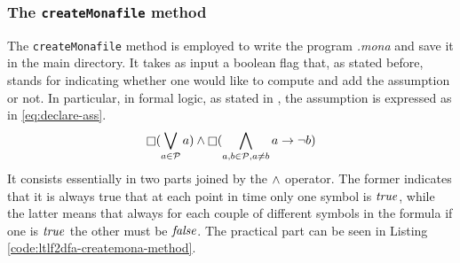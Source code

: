 \subsubsection{The \texttt{createMonafile} method}
The \texttt{createMonafile} method is employed to write the program \textit{.mona} and save it in the main directory. It takes as input a boolean flag that, as stated before, stands for indicating whether one would like to compute and add the \declare assumption or not. In particular, in formal logic, as stated in \citep{DeGiacomo:2014:RLF:2893873.2894033}, the \declare assumption is expressed as in \ref{eq:declare-ass}.
\begin{equation}\label{eq:declare-ass}
\Always (\bigvee_{a \in \P} a) \lAND \Always (\bigwedge_{a,b \in \P, a \neq b} a \rightarrow \NOT b) 
\end{equation}
It consists essentially in two parts joined by the $\wedge$ operator. The former indicates that it is always true that at each point in time only one symbol is $\mathit{true}$, while the latter means that always for each couple of different symbols in the formula if one is $\mathit{true}$ the other must be $\mathit{false}$.
The practical part can be seen in Listing \ref{code:ltlf2dfa-createmona-method}.
